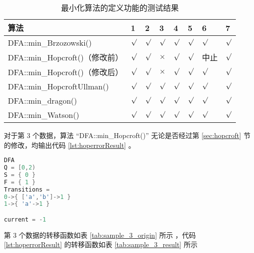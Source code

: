 \begin{table}[!htbp]
    \caption{ 最小化算法的定义功能的测试结果 }
    \label{tab:MinResult}
    \centering
    \small%
    \setlength{\tabcolsep}{4pt}%
    \renewcommand{\arraystretch}{1.2}%
    \begin{tabular}{l| p{2em}<{\centering} p{2em}<{\centering} p{2em}<{\centering} p{2em}<{\centering} p{2em}<{\centering} p{2em}<{\centering} p{2em}<{\centering} }  %
        \toprule %
        算法 & 1 & 2 & 3 & 4 &  5 & 6 & 7 \\
        \midrule
        DFA::min\_Brzozowski()        & $\surd$ & $\surd$ & $\surd$   & $\surd$ & $\surd$ & $\surd$     & $\surd$       \\
        DFA::min\_Hopcroft()（修改前） & $\surd$ & $\surd$ & $\times$  & $\surd$ & $\surd$ & 中止        & $\surd$       \\
        DFA::min\_Hopcroft()（修改后） & $\surd$ & $\surd$ & $\times$  & $\surd$ & $\surd$ & $\surd$     & $\surd$       \\
        DFA::min\_HopcroftUllman()    & $\surd$ & $\surd$ & $\surd$   & $\surd$ & $\surd$ & $\surd$     & $\surd$       \\
        DFA::min\_dragon()            & $\surd$ & $\surd$ & $\surd$   & $\surd$ & $\surd$ & $\surd$     & $\surd$       \\
        DFA::min\_Watson()            & $\surd$ & $\surd$ & $\surd$   & $\surd$ & $\surd$ & $\surd$     & $\surd$       \\
        \bottomrule%
    \end{tabular}
\end{table}

对于第 3 个数据，算法 “DFA::min\_Hopcroft()” 无论是否经过第 \ref{sec:hopcroft} 节的修改，均输出代码 \ref{lst:hoperrorResult} 。

\begin{lstlisting}[language=C++,label={lst:hoperrorResult},caption={ 第 3 个数据在算法 “DFA::min\_Hopcroft()” 中的输出 }]
DFA
Q = [0,2)
S = { 0 }
F = { 1 }
Transitions =
0->{ ['a','b']->1 }
1->{ 'a'->1 }

current = -1
\end{lstlisting}

第 3 个数据的转移函数如表 \ref{tab:sample_3_origin} 所示 ，代码 \ref{lst:hoperrorResult} 的转移函数如表 \ref{tab:sample_3_result} 所示 

